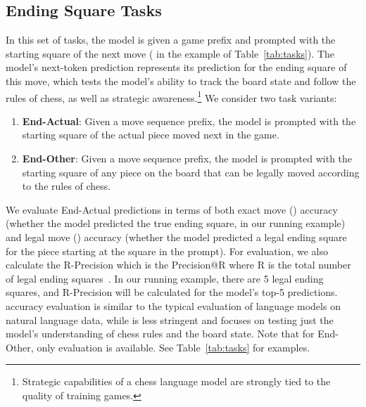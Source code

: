 \subsection{Ending Square Tasks}
In this set of tasks, the model is given a game prefix and prompted with the starting square of the next move ( in the example of Table~\ref{tab:tasks}). The model's next-token prediction represents its prediction for the ending square of this move,
which
tests the model's ability to track the board state and follow
the rules of chess,
as well as strategic awareness.\footnote{Strategic capabilities of a chess language model are strongly tied to the quality of training games.}  We consider two task variants: %
\begin{enumerate}
	\item \textbf{End-Actual}: Given a move sequence prefix, the model is prompted with the starting square of the actual piece moved next in the game. %
	\item \textbf{End-Other}: Given a move sequence prefix, the model is prompted with the starting square of any piece on the board that can be legally moved according to the rules of chess. 
\end{enumerate}
We evaluate End-Actual predictions in terms of both exact move (\exactmove) accuracy (whether the model predicted the true ending square,  in our running example) and legal move (\legalmove) accuracy (whether the model predicted a legal ending square for the piece starting at the square in the prompt). 
For \legalmove evaluation, we also calculate the R-Precision which is the Precision@R where R is the total number of legal ending squares~\cite{ir-book}. In our running example, there are 5 legal ending squares, and R-Precision will be calculated for the model's top-5 predictions.
\exactmove accuracy evaluation is similar to the typical evaluation of language models on natural language data, while \legalmove is less stringent and focuses on testing just the model's understanding of chess rules and the board state. Note that for End-Other, only \legalmove evaluation is available. See Table~\ref{tab:tasks} for examples.


